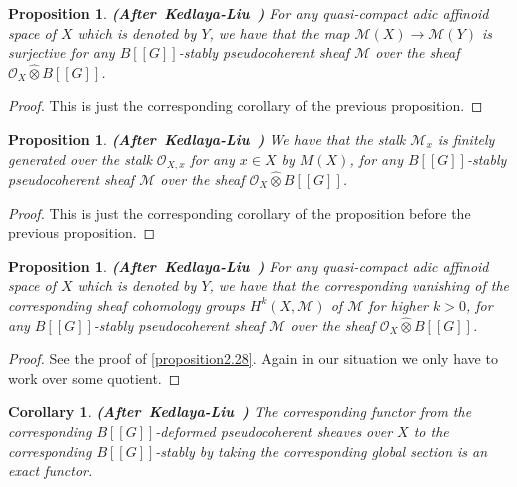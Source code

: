 \documentclass[12pt]{amsart}
\newtheorem{proposition}[theorem]{Proposition}
\newtheorem{corollary}[theorem]{Corollary}
\theoremstyle{definition}
\numberwithin{equation}{section}
\begin{document}
\begin{proposition}  \mbox{\bf{(After Kedlaya-Liu \cite[Theorem 2.6.5]{KL2})}}
For any quasi-compact adic affinoid space of $X$ which is denoted by $Y$, we have that the map $\mathcal{M}(X)\rightarrow \mathcal{M}(Y)$ is surjective for any $B[[G]]$-stably pseudocoherent sheaf $\mathcal{M}$ over the sheaf $\mathcal{O}_X\widehat{\otimes}B[[G]]$.	
\end{proposition}


\begin{proof}
This is just the corresponding corollary of the previous proposition.	
\end{proof}



\begin{proposition}  \mbox{\bf{(After Kedlaya-Liu \cite[Theorem 2.6.5]{KL2})}}
We have that the stalk $\mathcal{M}_x$ is finitely generated over the stalk $\mathcal{O}_{X,x}$ for any $x\in X$ by $M(X)$, for any $B[[G]]$-stably pseudocoherent sheaf $\mathcal{M}$ over the sheaf $\mathcal{O}_X\widehat{\otimes}B[[G]]$.	
\end{proposition}


\begin{proof}
This is just the corresponding corollary of the proposition before the previous proposition.	
\end{proof}


\begin{proposition}  \mbox{\bf{(After Kedlaya-Liu \cite[Theorem 2.6.5]{KL2})}}
For any quasi-compact adic affinoid space of $X$ which is denoted by $Y$, we have that the corresponding vanishing of the corresponding sheaf cohomology groups $H^k(X,\mathcal{M})$ of $\mathcal{M}$ for higher $k>0$, for any $B[[G]]$-stably pseudocoherent sheaf $\mathcal{M}$ over the sheaf $\mathcal{O}_X\widehat{\otimes}B[[G]]$.	
\end{proposition}


\begin{proof}
See the proof of \cref{proposition2.28}. Again in our situation we only have to work over some quotient.

\end{proof}



\begin{corollary}  \mbox{\bf{(After Kedlaya-Liu \cite[Corollary 2.6.6]{KL2})}}
The corresponding functor from the corresponding $B[[G]]$-deformed pseudocoherent sheaves over $X$ to the corresponding $B[[G]]$-stably by taking the corresponding global section is an exact functor.
\end{corollary}
\end{document}

